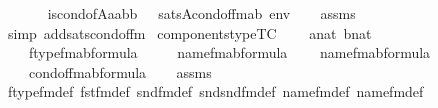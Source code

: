 \begin{isabellebody}
\ \ \isanewline
\ \ \ \ {\isachardoublequoteopen}is{\isacharunderscore}{\kern0pt}cond{\isacharunderscore}{\kern0pt}of{\isacharparenleft}{\kern0pt}{\isacharhash}{\kern0pt}{\isacharhash}{\kern0pt}A{\isacharcomma}{\kern0pt}aa{\isacharcomma}{\kern0pt}bb{\isacharparenright}{\kern0pt}\ \ {\isasymlongleftrightarrow}\ sats{\isacharparenleft}{\kern0pt}A{\isacharcomma}{\kern0pt}cond{\isacharunderscore}{\kern0pt}of{\isacharunderscore}{\kern0pt}fm{\isacharparenleft}{\kern0pt}a{\isacharcomma}{\kern0pt}b{\isacharparenright}{\kern0pt}{\isacharcomma}{\kern0pt}\ env{\isacharparenright}{\kern0pt}{\isachardoublequoteclose}\isanewline
%
\isadelimproof
\ \ %
\endisadelimproof
%
\isatagproof
{}\isamarkupfalse%
\ assms\isanewline
\ \ \isamarkupfalse%
\ {\isacharparenleft}{\kern0pt}simp\ add{\isacharcolon}{\kern0pt}sats{\isacharunderscore}{\kern0pt}cond{\isacharunderscore}{\kern0pt}of{\isacharunderscore}{\kern0pt}fm{\isacharparenright}{\kern0pt}%
\endisatagproof
{\isafoldproof}%
%
\isadelimproof
\isanewline
%
\endisadelimproof
\isanewline
{}\isamarkupfalse%
\ components{\isacharunderscore}{\kern0pt}type{\isacharbrackleft}{\kern0pt}TC{\isacharbrackright}{\kern0pt}\ {\isacharcolon}{\kern0pt}\isanewline
\ \ \ {\isachardoublequoteopen}a{\isasymin}nat{\isachardoublequoteclose}\ {\isachardoublequoteopen}b{\isasymin}nat{\isachardoublequoteclose}\isanewline
\ \ \ \isanewline
\ \ \ \ {\isachardoublequoteopen}ftype{\isacharunderscore}{\kern0pt}fm{\isacharparenleft}{\kern0pt}a{\isacharcomma}{\kern0pt}b{\isacharparenright}{\kern0pt}{\isasymin}formula{\isachardoublequoteclose}\ \isanewline
\ \ \ \ {\isachardoublequoteopen}name{}{\isacharunderscore}{\kern0pt}fm{\isacharparenleft}{\kern0pt}a{\isacharcomma}{\kern0pt}b{\isacharparenright}{\kern0pt}{\isasymin}formula{\isachardoublequoteclose}\isanewline
\ \ \ \ {\isachardoublequoteopen}name{}{\isacharunderscore}{\kern0pt}fm{\isacharparenleft}{\kern0pt}a{\isacharcomma}{\kern0pt}b{\isacharparenright}{\kern0pt}{\isasymin}formula{\isachardoublequoteclose}\isanewline
\ \ \ \ {\isachardoublequoteopen}cond{\isacharunderscore}{\kern0pt}of{\isacharunderscore}{\kern0pt}fm{\isacharparenleft}{\kern0pt}a{\isacharcomma}{\kern0pt}b{\isacharparenright}{\kern0pt}{\isasymin}formula{\isachardoublequoteclose}\isanewline
%
\isadelimproof
\ \ %
\endisadelimproof
%
\isatagproof
{}\isamarkupfalse%
\ assms\isanewline
\ \ \isamarkupfalse%
\ ftype{\isacharunderscore}{\kern0pt}fm{\isacharunderscore}{\kern0pt}def\ fst{\isacharunderscore}{\kern0pt}fm{\isacharunderscore}{\kern0pt}def\ snd{\isacharunderscore}{\kern0pt}fm{\isacharunderscore}{\kern0pt}def\ snd{\isacharunderscore}{\kern0pt}snd{\isacharunderscore}{\kern0pt}fm{\isacharunderscore}{\kern0pt}def\ name{}{\isacharunderscore}{\kern0pt}fm{\isacharunderscore}{\kern0pt}def\ name{}{\isacharunderscore}{\kern0pt}fm{\isacharunderscore}{\kern0pt}def\ \isanewline

\end{isabellebody}
